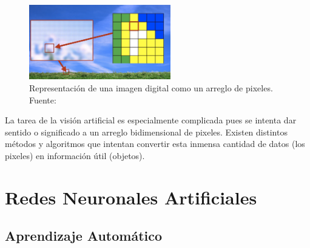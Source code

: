     \begin{figure}[!h] 
        \centering
        \includegraphics[width=0.55\textwidth]{img/digitalimg}
        \caption[Representación de una imagen digital]{Representación de una imagen digital como un arreglo de pixeles. Fuente: \cite{Szeliski2011} }
        \label{fig:digitalimg}
    \end{figure}

    La tarea de la visión artificial es especialmente complicada pues se intenta dar sentido o significado a un arreglo bidimensional 
    de pixeles. Existen distintos métodos y algoritmos que intentan convertir esta inmensa cantidad de datos (los pixeles) en 
    información útil (objetos).

\section{Redes Neuronales Artificiales}\label{sec:redesneuronales}         %

    \subsection{Aprendizaje Automático}

